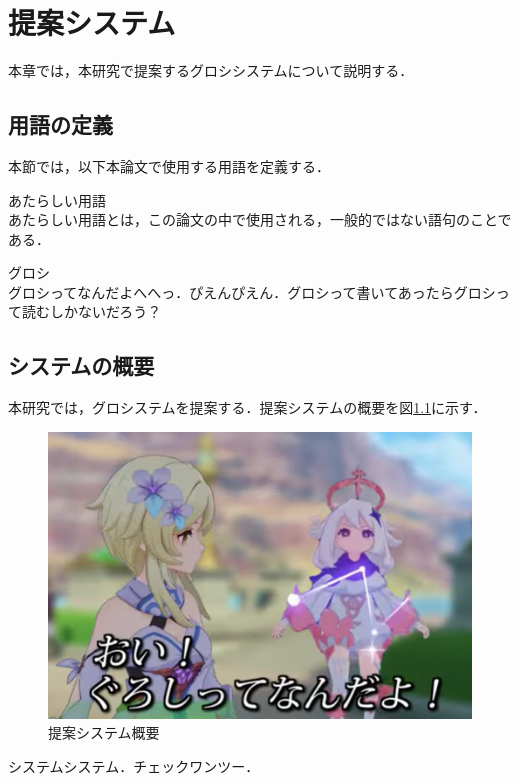 \documentclass[main]{subfiles}
\begin{document}
\chapter{提案システム}
本章では，本研究で提案するグロシシステムについて説明する．

\section{用語の定義}
本節では，以下本論文で使用する用語を定義する．

\begin{definition}あたらしい用語\\
あたらしい用語とは，この論文の中で使用される，一般的ではない語句のことである．
\end{definition}

\begin{definition}グロシ\\
    グロシってなんだよへへっ．ぴえんぴえん．グロシって書いてあったらグロシって読むしかないだろう？
\end{definition}

\section{システムの概要}
本研究では，グロシステムを提案する．提案システムの概要を図\ref{fig:system_gaiyou_1}に示す．

\begin{figure}[htb]
    \centering
    \includegraphics[width=0.9\linewidth]{figures/system_gaiyou_1.png}
    \caption{提案システム概要}
    \label{fig:system_gaiyou_1}
\end{figure}

システムシステム．チェックワンツー．
\end{document}
